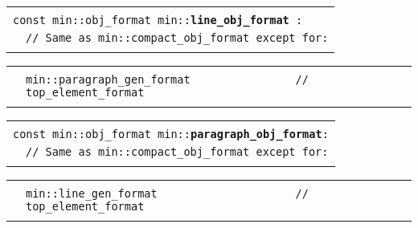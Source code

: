 \documentclass[12pt]{article}
\makeatletter
\newcommand{\TT}[1]{{\tt \bfseries #1}}
\newcommand{\ttindex}[1]{\index{#1@{\tt #1}}}
\newenvironment{indpar}[1][0.3in]%
	{\begin{list}{}%
		     {\setlength{\itemsep}{0in}%
		      \setlength{\topsep}{0in}%
		      \setlength{\parsep}{1ex}%
		      \setlength{\labelwidth}{#1}%
		      \setlength{\leftmargin}{#1}%
		      \addtolength{\leftmargin}{\labelsep}}%
	 \item}%
	{\end{list}}
\newcommand{\LABEL}[1]{\label{#1}}
\newlength{\ARGBREAKLENGTH}
\newcommand{\ARGBREAK}[1][\ARGBREAKLENGTH]{\\&\hspace*{#1}}
\newcommand{\MINKEY}[1]%
	   {\TT{#1}\ttindex{min::#1}\ttindex{#1}}
\newcommand{\MINLKEY}[2]%
           {\TT{#1#2}\index{min::#1@{\tt min::#1}!#2@{\tt #2}}%
                     \index{#1@{\tt #1}!#2@{\tt #2}}}
\makeatother
\begin{document}
\begin{indpar}[1em]

\begin{tabular}{r@{}l}\hspace*{0.1in} \\[-3ex]
\multicolumn{2}{l}{\tt const min::obj\_format
                   min::\MINLKEY{line}{\_obj\_format}:}%
\LABEL{MIN::LINE_OBJ_FORMAT}\ARGBREAK
\verb|// Same as min::compact_obj_format except for:|\ARGBREAK
\end{tabular}

\vspace{-4ex}\begin{tabular}{r@{}l}\hspace*{0.1in}\ARGBREAK
\verb|min::paragraph_gen_format                // top_element_format|\ARGBREAK
\end{tabular}

\end{indpar}

\begin{indpar}[1em]

\begin{tabular}{r@{}l}\hspace*{0.1in} \\[-3ex]
\multicolumn{2}{l}{\tt const min::obj\_format
                   min::\MINKEY{paragraph\_obj\_format}:}%
\LABEL{MIN::PARAGRAPH_OBJ_FORMAT}\ARGBREAK
\verb|// Same as min::compact_obj_format except for:|\ARGBREAK
\end{tabular}

\vspace{-4ex}\begin{tabular}{r@{}l}\hspace*{0.1in}\ARGBREAK
\verb|min::line_gen_format                     // top_element_format|\ARGBREAK
\end{tabular}

\end{indpar}
\end{document}
